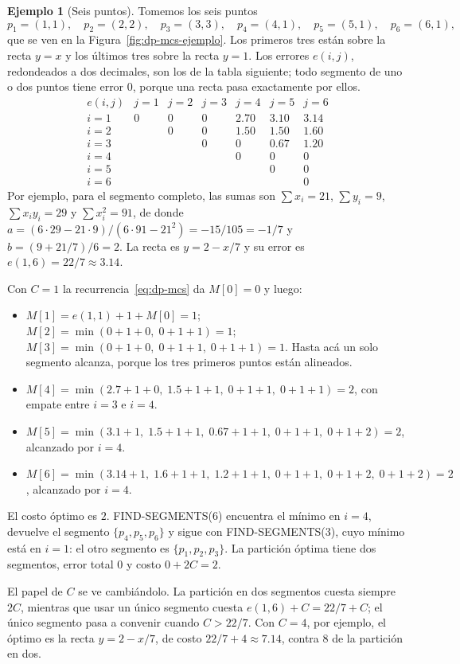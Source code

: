 \documentclass[12pt, spanish, oneside, openany]{book}
\newcommand{\alg}[1]{#1}
\theoremstyle{uprightplain}
\theoremstyle{definition}
\newtheorem{ejemplo}[teorema]{Ejemplo}
\theoremstyle{remark}
\theoremstyle{definition}
\begin{document}
\begin{ejemplo}[Seis puntos]
\label{ej:dp-mcs}
Tomemos los seis puntos
\[
p_1=(1,1),\quad p_2=(2,2),\quad p_3=(3,3),\quad p_4=(4,1),\quad p_5=(5,1),\quad p_6=(6,1),
\]
que se ven en la Figura~\ref{fig:dp-mcs-ejemplo}. Los primeros tres están sobre la recta $y=x$ y los últimos tres sobre la recta $y=1$. Los errores $e(i,j)$, redondeados a dos decimales, son los de la tabla siguiente; todo segmento de uno o dos puntos tiene error $0$, porque una recta pasa exactamente por ellos.
\[
\begin{array}{c|cccccc}
e(i,j) & j=1 & j=2 & j=3 & j=4 & j=5 & j=6\\\hline
i=1 & 0 & 0 & 0 & 2.70 & 3.10 & 3.14\\
i=2 &   & 0 & 0 & 1.50 & 1.50 & 1.60\\
i=3 &   &   & 0 & 0 & 0.67 & 1.20\\
i=4 &   &   &   & 0 & 0 & 0\\
i=5 &   &   &   &   & 0 & 0\\
i=6 &   &   &   &   &   & 0
\end{array}
\]
Por ejemplo, para el segmento completo, las sumas son $\sum x_i=21$, $\sum y_i=9$, $\sum x_iy_i=29$ y $\sum x_i^2=91$, de donde $a=(6\cdot 29-21\cdot 9)/(6\cdot 91-21^2)=-15/105=-1/7$ y $b=(9+21/7)/6=2$. La recta es $y=2-x/7$ y su error es $e(1,6)=22/7\approx 3.14$.

Con $C=1$ la recurrencia~\eqref{eq:dp-mcs} da $M[0]=0$ y luego:
\begin{itemize}
    \item $M[1]=e(1,1)+1+M[0]=1$; $M[2]=\min(0+1+0,\;0+1+1)=1$; $M[3]=\min(0+1+0,\;0+1+1,\;0+1+1)=1$. Hasta acá un solo segmento alcanza, porque los tres primeros puntos están alineados.
    \item $M[4]=\min(2.7+1+0,\;1.5+1+1,\;0+1+1,\;0+1+1)=2$, con empate entre $i=3$ e $i=4$.
    \item $M[5]=\min(3.1+1,\;1.5+1+1,\;0.67+1+1,\;0+1+1,\;0+1+2)=2$, alcanzado por $i=4$.
    \item $M[6]=\min(3.14+1,\;1.6+1+1,\;1.2+1+1,\;0+1+1,\;0+1+2,\;0+1+2)=2$, alcanzado por $i=4$.
\end{itemize}
El costo óptimo es $2$. \alg{FIND-SEGMENTS}($6$) encuentra el mínimo en $i=4$, devuelve el segmento $\{p_4,p_5,p_6\}$ y sigue con \alg{FIND-SEGMENTS}($3$), cuyo mínimo está en $i=1$: el otro segmento es $\{p_1,p_2,p_3\}$. La partición óptima tiene dos segmentos, error total $0$ y costo $0+2C=2$.

El papel de $C$ se ve cambiándolo. La partición en dos segmentos cuesta siempre $2C$, mientras que usar un único segmento cuesta $e(1,6)+C=22/7+C$; el único segmento pasa a convenir cuando $C>22/7$. Con $C=4$, por ejemplo, el óptimo es la recta $y=2-x/7$, de costo $22/7+4\approx 7.14$, contra $8$ de la partición en dos.
\end{ejemplo}
\end{document}
